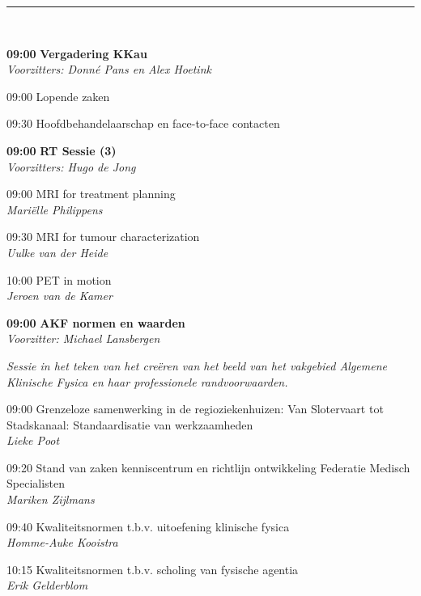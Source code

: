 \documentclass[a4paper,10pt]{report}
\begin{document}
\begin{multicols*}{3}
\vfill
\hrule\vspace{3mm}

\\
\vfill
{}
\begin{packed_enum}
\item[\textbf{09:00}] \textbf{Vergadering KKau}\\\textit{Voorzitters: Donn\'e Pans en Alex Hoetink}
\item[09:00] Lopende zaken
\item[09:30] Hoofdbehandelaarschap en face-to-face contacten 
\end{packed_enum}
\columnbreak

\begin{packed_enum}
\item[\textbf{09:00}] \textbf{RT Sessie (3)}\\\textit{Voorzitters: Hugo de Jong}
\item[09:00] MRI for treatment planning\\\textit{Mariëlle Philippens}
\item[09:30] MRI for tumour characterization\\\textit{Uulke van der Heide}
\item[10:00] PET in motion\\\textit{Jeroen van de Kamer}
\end{packed_enum}

\vfill
{}
\begin{packed_enum}
\item[\textbf{09:00}] \textbf{AKF normen en waarden}\\\textit{Voorzitter: Michael Lansbergen}
\end{packed_enum}
\textit{Sessie in het teken van het cre\"eren van het beeld van het vakgebied Algemene Klinische Fysica en haar professionele randvoorwaarden.}
\begin{packed_enum}
\item[09:00] Grenzeloze samenwerking in de regioziekenhuizen: Van Slotervaart tot Stadskanaal: Standaardisatie van werkzaamheden\\\textit{Lieke Poot}
\item[09:20] Stand van zaken kenniscentrum en richtlijn ontwikkeling Federatie Medisch Specialisten\\\textit{Mariken Zijlmans}
\item[09:40] Kwaliteitsnormen t\@.b\@.v\@. uitoefening klinische fysica\\\textit{Homme-Auke Kooistra} 
\item[10:15] Kwaliteitsnormen t\@.b\@.v\@. scholing van fysische agentia\\\textit{Erik Gelderblom}
\end{packed_enum}


\end{multicols*}
\end{document}

